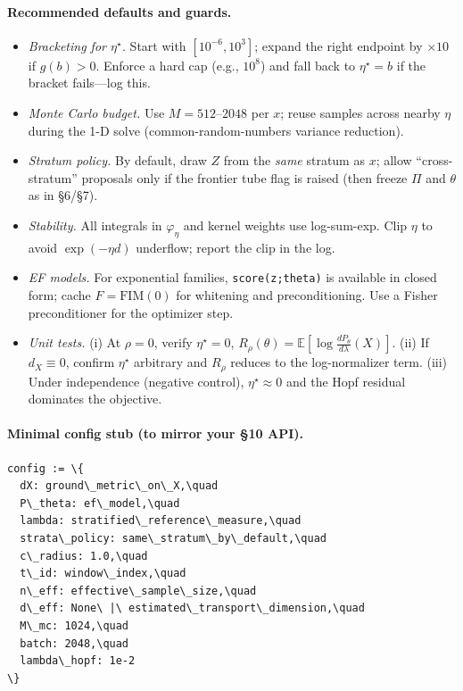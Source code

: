 \documentclass[10pt]{article}
\begin{document}
\paragraph{Recommended defaults and guards.}
\begin{itemize}[leftmargin=*]
\item \emph{Bracketing for \(\eta^\star\).} Start with \([10^{-6},10^3]\); expand the right endpoint by \(\times 10\) if \(g(b)>0\). Enforce a hard cap (e.g., \(10^8\)) and fall back to \(\eta^\star=b\) if the bracket fails—log this.
\item \emph{Monte Carlo budget.} Use \(M=512\)–\(2048\) per \(x\); reuse samples across nearby \(\eta\) during the 1-D solve (common-random-numbers variance reduction).
\item \emph{Stratum policy.} By default, draw \(Z\) from the \emph{same} stratum as \(x\); allow “cross-stratum” proposals only if the frontier tube flag is raised (then freeze \(\Pi\) and \(\theta\) as in §6/§7).
\item \emph{Stability.} All integrals in \(\varphi_\eta\) and kernel weights use log-sum-exp. Clip \(\eta\) to avoid \(\exp(-\eta d)\) underflow; report the clip in the log.
\item \emph{EF models.} For exponential families, \texttt{score(z;theta)} is available in closed form; cache \(F=\mathrm{FIM}(0)\) for whitening and preconditioning. Use a Fisher preconditioner for the optimizer step.
\item \emph{Unit tests.} (i) At \(\rho=0\), verify \(\eta^\star\!=\!0\), \(R_\rho(\theta)=\mathbb E[\log \frac{dP_\theta}{d\lambda}(X)]\). (ii) If \(d_X\equiv 0\), confirm \(\eta^\star\) arbitrary and \(R_\rho\) reduces to the log-normalizer term. (iii) Under independence (negative control), \(\eta^\star\approx 0\) and the Hopf residual dominates the objective.
\end{itemize}

\paragraph{Minimal config stub (to mirror your §10 API).}
\begin{lstlisting}
config := \{
  dX: ground\_metric\_on\_X,\quad
  P\_theta: ef\_model,\quad
  lambda: stratified\_reference\_measure,\quad
  strata\_policy: same\_stratum\_by\_default,\quad
  c\_radius: 1.0,\quad
  t\_id: window\_index,\quad
  n\_eff: effective\_sample\_size,\quad
  d\_eff: None\ |\ estimated\_transport\_dimension,\quad
  M\_mc: 1024,\quad
  batch: 2048,\quad
  lambda\_hopf: 1e-2
\}
\end{lstlisting}
\end{document}
